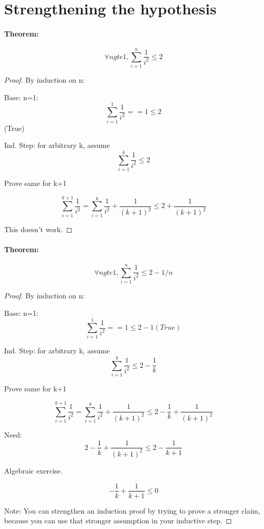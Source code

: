 \documentclass[11pt, notitlepage]{report}
\newenvironment{theorem}{\paragraph{Theorem:}}{\hfill}
\begin{document}
\section{Strengthening the hypothesis}

\begin{theorem}
	\[\forall n gte 1, \sum_{i=1}^{n} \frac{1}{i^2} \leq 2\]
	
	\begin{proof} By induction on n:
	
	Base: n=1:  \[\sum_{i=1}^{1} \frac{1}{i^2} == 1 \leq 2 \](True)
	
	Ind. Step: for arbitrary k, assume \[ \sum_{i=1}^{k} \frac{1}{i^2} \leq 2\]
	
	Prove same for k+1
	
	\[\sum_{i=1}^{k+1} \frac{1}{i^2} = \sum_{i=1}^{k} \frac{1}{i^2} + \frac{1}{(k+1)^2} \leq 2 + \frac{1}{(k+1)^2}\]
	
	This doesn't work.
		
	\end{proof}
\end{theorem}

\begin{theorem}

	\[\forall n gte 1, \sum_{i=1}^{n} \frac{1}{i^2} \leq 2 - 1/n\]
	
	\begin{proof} By induction on n:
	
	Base: n=1:  \[\sum_{i=1}^{1} \frac{1}{i^2} == 1 \leq 2 -1 (True)\]
	
	Ind. Step: for arbitrary k, assume \[\sum_{i=1}^{k} \frac{1}{i^2} \leq 2 - \frac{1}{k}\]
	
	Prove same for k+1
	
	\[\sum_{i=1}^{k+1} \frac{1}{i^2} = \sum_{i=1}^{k} \frac{1}{i^2} + \frac{1}{(k+1)^2} \leq 2 - \frac{1}{k} + \frac{1}{(k+1)^2}\]

	Need: \[2-\frac{1}{k}+\frac{1}{(k+1)^2} \leq 2 - \frac{1}{k+1}\]
	
	Algebraic exercise.
	
	\[-\frac{1}{k}+\frac{1}{k+1} \leq 0\]
	
	Note: You can strengthen an induction proof by trying to prove a stronger claim, because you can use that stronger assumption in your inductive step.
	
	\end{proof}
	
\end{theorem}
\end{document}
